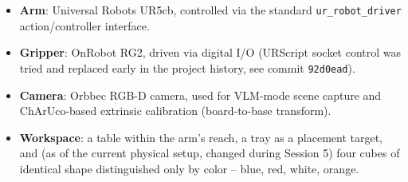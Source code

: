 \begin{itemize}[nosep]
  \item \textbf{Arm}: Universal Robots UR5cb, controlled via the standard
    \texttt{ur\_robot\_driver} action/controller interface.
  \item \textbf{Gripper}: OnRobot RG2, driven via digital I/O (URScript
    socket control was tried and replaced early in the project history, see
    commit \texttt{92d0ead}).
  \item \textbf{Camera}: Orbbec RGB-D camera, used for VLM-mode scene capture
    and ChArUco-based extrinsic calibration (board-to-base transform).
  \item \textbf{Workspace}: a table within the arm's reach, a tray as a
    placement target, and (as of the current physical setup, changed during
    Session 5) four cubes of identical shape distinguished only by color --
    blue, red, white, orange.
\end{itemize}
